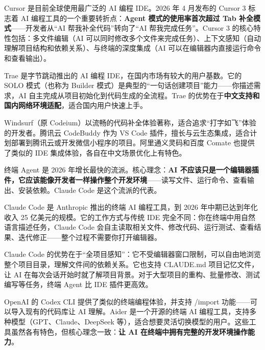 Cursor 是目前全球使用最广泛的 AI 编程 IDE。2026 年 4 月发布的 Cursor 3 标志着 AI 编程工具的一个重要转折点：\textbf{Agent 模式的使用率首次超过 Tab 补全模式}——开发者从“AI 帮我补全代码”转向了“AI 帮我完成任务”。Cursor 3 的核心特性包括：多文件编辑（AI 可以同时修改多个文件来完成任务）、上下文感知（自动理解项目结构和依赖关系）、与终端的深度集成（AI 可以在编辑器内直接运行命令和查看输出）。


Trae 是字节跳动推出的 AI 编程 IDE，在国内市场有较大的用户基数。它的 SOLO 模式（也称为 Builder 模式）是典型的“一句话创建项目”能力——你描述需求，AI 自主完成从项目初始化到代码生成的全流程。Trae 的优势在于\textbf{中文支持和国内网络环境适配}，适合国内用户快速上手。


Windsurf（原 Codeium）以流畅的代码补全体验著称，适合追求“打字如飞”体验的开发者。腾讯云 CodeBuddy 作为 VS Code 插件，擅长与云生态集成，适合计划部署到腾讯云或开发微信小程序的项目。阿里通义灵码和百度 Comate 也提供了类似的 IDE 集成体验，各自在中文场景优化上有特色。


终端 Agent 是 2026 年增长最快的流派。核心理念：\textbf{AI 不应该只是一个编辑器插件，它应该能像开发者一样操作整个开发环境}——读写文件、运行命令、查看输出、安装依赖。Claude Code 是这个流派的代表。


Claude Code 是 Anthropic 推出的终端 AI 编程工具，到 2026 年中期已达到年化收入 25 亿美元的规模。它的工作方式与传统 IDE 完全不同：你在终端中用自然语言描述任务，Claude Code 会自主读取相关文件、修改代码、运行测试、查看结果、迭代修正——整个过程不需要你打开编辑器。

Claude Code 的优势在于“全项目感知”：它不受编辑器窗口限制，可以自由地浏览整个项目目录，理解文件间的依赖关系。它也支持 CLAUDE.md 项目记忆文件，让 AI 在每次会话开始时就了解项目背景。对于大型项目的重构、批量修改、测试编写等任务，终端 Agent 比 IDE 插件更高效。


OpenAI 的 Codex CLI 提供了类似的终端编程体验，并支持 /import 功能——可以导入现有的代码库让 AI 理解。Aider 是一个开源的终端 AI 编程工具，支持多种模型（GPT、Claude、DeepSeek 等），适合想要灵活切换模型的用户。这些工具虽然各有特色，但核心理念一致：\textbf{让 AI 在终端中拥有完整的开发环境操作能力}。


